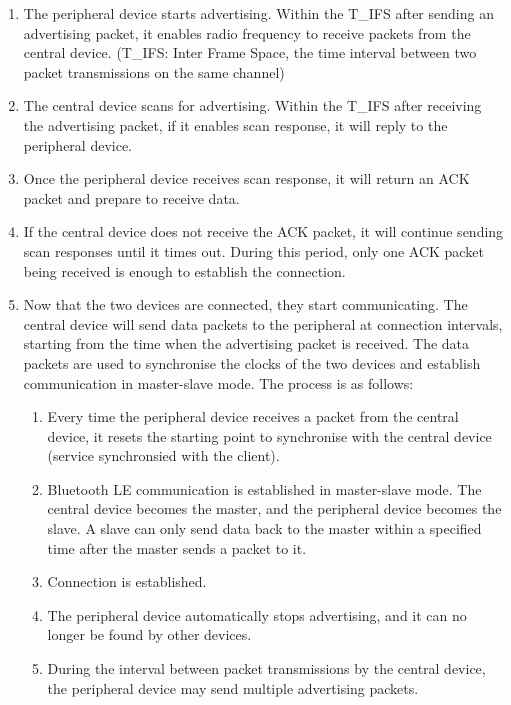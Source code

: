 \documentclass[a4paper,12pt,openany]{book}
\begin{document}
\begin{enumerate}[label=(\arabic*)]
    \item The peripheral device starts advertising. Within the T\_IFS after sending an advertising packet, it enables radio frequency to receive packets from the central device. (T\_IFS: Inter Frame Space, the time interval between two packet transmissions on the same channel)
    \item The central device scans for advertising. Within the T\_IFS after receiving the advertising packet, if it enables scan response, it will reply to the peripheral device.
    \item Once the peripheral device receives scan response, it will return an ACK packet and prepare to receive data.
    \item If the central device does not receive the ACK packet, it will continue sending scan responses until it times out. During this period, only one ACK packet being received is enough to establish the connection.
    \item Now that the two devices are connected, they start communicating. The central device will send data packets to the peripheral at connection intervals, starting from the time when the advertising packet is received. The data packets are used to synchronise the clocks of the two devices and establish communication in master-slave mode. The process is as follows:

    \begin{enumerate}[label=\alph*., leftmargin=1.5em]
        \item Every time the peripheral device receives a packet from the central device, it resets the starting point to synchronise with the central device (service synchronsied with the client).
        \item Bluetooth LE communication is established in master-slave mode. The central device becomes the master, and the peripheral device becomes the slave. A slave can only send data back to the master within a specified time after the master sends a packet to it.
        \item Connection is established.
        \item The peripheral device automatically stops advertising, and it can no longer be found by other devices.
        \item During the interval between packet transmissions by the central device, the peripheral device may send multiple advertising packets.
    \end{enumerate}


\end{enumerate}
\end{document}
